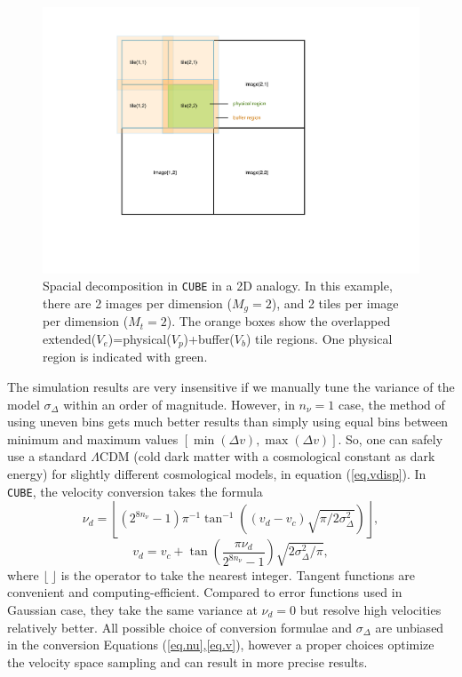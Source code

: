 \documentclass[10pt,twocolumn,preprint]{emulateapj}
\begin{document}
\begin{figure}
\centering
  \includegraphics[width=0.9\linewidth]{f2}
 \caption{Spacial decomposition in {\tt CUBE} in a 2D analogy. In this example, there are 2 images per dimension ($M_g=2$), and 2 tiles per image per dimension ($M_t=2$). The orange boxes show the overlapped extended($V_e$)=physical($V_p$)+buffer($V_b$) tile regions. One physical region is indicated with green.}
\label{fig.tile}
\end{figure}

The simulation results are very insensitive if we manually tune the variance of the model $\sigma_\Delta$ within an order of magnitude. However, in $n_\nu=1$ case, the method of using uneven bins gets much better results than simply using equal bins between minimum and maximum values $[\min(\Delta v),\max(\Delta v)]$. So, one can safely use a standard $\Lambda$CDM (cold dark matter with a cosmological constant as dark energy) for slightly different cosmological models, in equation (\ref{eq.vdisp}). In {\tt CUBE}, the velocity conversion takes the formula
\begin{equation}\label{eq.nu}
	\nu_d=\left\lfloor(2^{8n_\nu}-1)\pi^{-1}\tan^{-1}\left((v_d-v_c)\sqrt{\pi/2\sigma_\Delta^2}\right)\right\rfloor,
\end{equation}
\begin{equation}\label{eq.v}
	v_d=v_c+\tan\left(\frac{\pi\nu_d}{2^{8n_\nu}-1}\right)\sqrt{2\sigma_\Delta^2/\pi},
\end{equation}
where $\lfloor\ \rfloor$ is the operator to take the nearest integer. Tangent functions are convenient and computing-efficient. Compared to error functions used in Gaussian case, they take the same variance at $\nu_d=0$ but resolve high velocities relatively better. All possible choice of conversion formulae and $\sigma_\Delta$ are unbiased in the conversion Equations (\ref{eq.nu},\ref{eq.v}), however a proper choices optimize the velocity space sampling and can result in more precise results.
\end{document}
